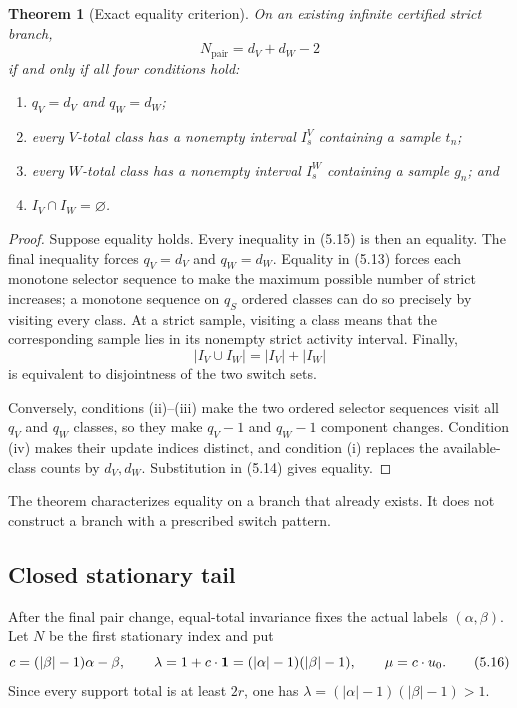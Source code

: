 \documentclass[11pt]{article}
\newtheorem{theorem}{Theorem}[section]
\theoremstyle{definition}
\theoremstyle{remark}
\begin{document}
\begin{theorem}[Exact equality criterion]
\label{thm:equality}
On an existing infinite certified strict branch,
\[
 N_{\mathrm{pair}}=d_V+d_W-2
\]
if and only if all four conditions hold:
\begin{enumerate}[label=(\roman*)]
\item \(q_V=d_V\) and \(q_W=d_W\);
\item every \(V\)-total class has a nonempty interval \(I_s^V\) containing
a sample \(t_n\);
\item every \(W\)-total class has a nonempty interval \(I_s^W\) containing
a sample \(g_n\); and
\item \(I_V\cap I_W=\varnothing\).
\end{enumerate}
\end{theorem}

\begin{proof}
Suppose equality holds.  Every inequality in (5.15) is then an equality.
The final inequality forces \(q_V=d_V\) and \(q_W=d_W\).  Equality in
(5.13) forces each monotone selector sequence to make the maximum possible
number of strict increases; a monotone sequence on \(q_S\) ordered classes
can do so precisely by visiting every class.  At a strict sample, visiting
a class means that the corresponding sample lies in its nonempty strict
activity interval.  Finally,
\[
 |I_V\cup I_W|=|I_V|+|I_W|
\]
is equivalent to disjointness of the two switch sets.

Conversely, conditions (ii)--(iii) make the two ordered selector sequences
visit all \(q_V\) and \(q_W\) classes, so they make \(q_V-1\) and
\(q_W-1\) component changes.  Condition (iv) makes their update indices
distinct, and condition (i) replaces the available-class counts by
\(d_V,d_W\).  Substitution in (5.14) gives equality.
\end{proof}

The theorem characterizes equality on a branch that already exists.  It
does not construct a branch with a prescribed switch pattern.

\subsection{Closed stationary tail}

After the final pair change, equal-total invariance fixes the actual labels
\((\alpha,\beta)\).  Let \(N\) be the first stationary index and put
\[
 c=(|\beta|-1)\alpha-\beta,\qquad
 \lambda=1+c\cdot\mathbf{1}=(|\alpha|-1)(|\beta|-1),\qquad
 \mu=c\cdot u_0.
\tag{5.16}
\]
Since every support total is at least \(2r\), one has
\(\lambda=(|\alpha|-1)(|\beta|-1)>1\).
\end{document}
